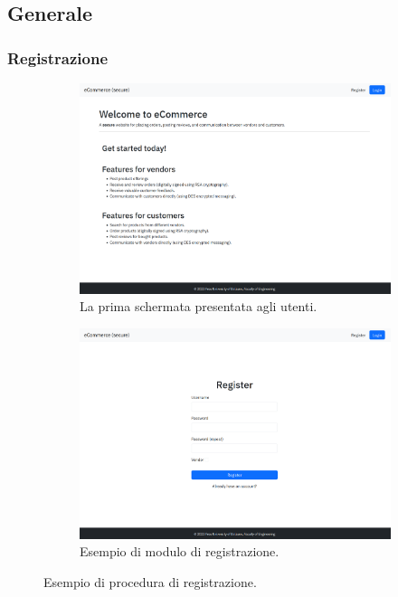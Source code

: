 \documentclass[conference,onecolumn,a4paper]{IEEEtran}
\begin{document}
{\subsection{Generale}

\subsubsection{Registrazione}

\begin{figure}[H]
    \centering
    \begin{subfigure}[b]{0.4\linewidth}
        \includegraphics[width=\linewidth]{resources/welcome.png}
        \caption{La prima schermata presentata agli utenti.}
    \end{subfigure}
    \begin{subfigure}[b]{0.4\linewidth}
        \includegraphics[width=\linewidth]{resources/register.png}
        \caption{Esempio di modulo di registrazione.}
    \end{subfigure}
    \caption{Esempio di procedura di registrazione.}
\end{figure}

}
\end{document}
